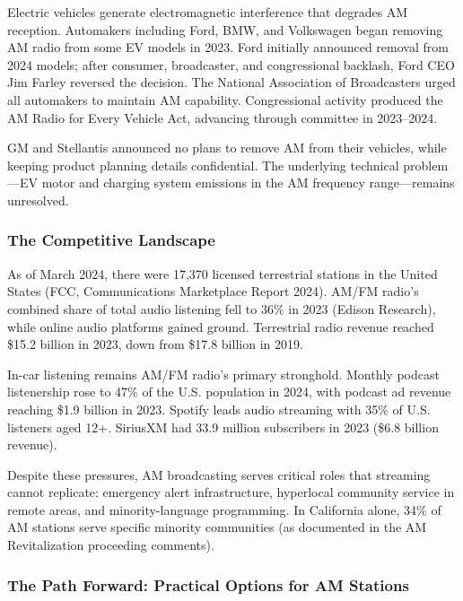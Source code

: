 \documentclass[11pt,letterpaper]{article}
\begin{document}
\begin{asciibox}
Electric vehicles generate electromagnetic interference that degrades AM reception. Automakers
including Ford, BMW, and Volkswagen began removing AM radio from some EV models in 2023.
Ford initially announced removal from 2024 models; after consumer, broadcaster, and congressional
backlash, Ford CEO Jim Farley reversed the decision. The National Association of Broadcasters
urged all automakers to maintain AM capability. Congressional activity produced the AM Radio
for Every Vehicle Act, advancing through committee in 2023--2024.

GM and Stellantis announced no plans to remove AM from their vehicles, while keeping product
planning details confidential. The underlying technical problem---EV motor and charging
system emissions in the AM frequency range---remains unresolved.

\subsubsection{The Competitive Landscape}

As of March 2024, there were 17,370 licensed terrestrial stations in the United States (FCC,
Communications Marketplace Report 2024). AM/FM radio's combined share of total audio listening
fell to 36\% in 2023 (Edison Research), while online audio platforms gained ground. Terrestrial
radio revenue reached \$15.2 billion in 2023, down from \$17.8 billion in 2019.

In-car listening remains AM/FM radio's primary stronghold. Monthly podcast listenership rose
to 47\% of the U.S. population in 2024, with podcast ad revenue reaching \$1.9 billion in 2023.
Spotify leads audio streaming with 35\% of U.S. listeners aged 12+. SiriusXM had 33.9 million
subscribers in 2023 (\$6.8 billion revenue).

Despite these pressures, AM broadcasting serves critical roles that streaming cannot replicate:
emergency alert infrastructure, hyperlocal community service in remote areas, and minority-language
programming. In California alone, 34\% of AM stations serve specific minority communities (as
documented in the AM Revitalization proceeding comments).

\subsubsection{The Path Forward: Practical Options for AM Stations}


\end{asciibox}
\end{document}
